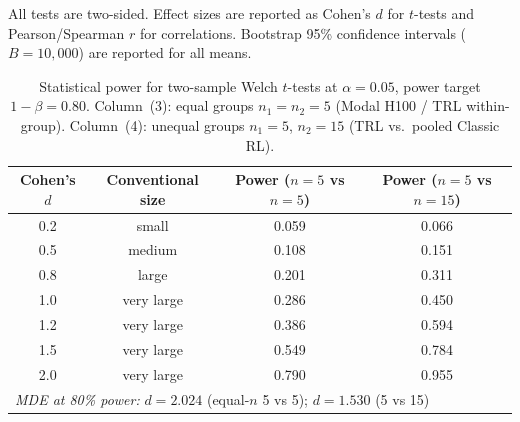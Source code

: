 \documentclass{article}  \usepackage[preprint,nonatbib]{neurips_2026} \usepackage[numbers]{natbib}
\begin{document}
All tests are two-sided.  Effect sizes are reported as Cohen's $d$ for
$t$-tests and Pearson/Spearman $r$ for correlations.  Bootstrap 95\%
confidence intervals ($B = 10{,}000$) are reported for all means.

\begin{table}[!ht]
\centering
\caption{Statistical power for two-sample Welch $t$-tests at $\alpha = 0.05$,
         power target $1{-}\beta = 0.80$.
         Column~(3): equal groups $n_1 = n_2 = 5$ (Modal H100 / TRL within-group).
         Column~(4): unequal groups $n_1 = 5$, $n_2 = 15$ (TRL vs.\ pooled Classic RL).}
\label{tab:power-analysis}
\small
\begin{tabular}{@{}cccc@{}}
\toprule
Cohen's $d$ & Conventional size & Power ($n{=}5$ vs $n{=}5$) & Power ($n{=}5$ vs $n{=}15$) \\
\midrule
        0.2 & small & 0.059 & 0.066 \\
        0.5 & medium & 0.108 & 0.151 \\
        0.8 & large & 0.201 & 0.311 \\
        1.0 & very large & 0.286 & 0.450 \\
        1.2 & very large & 0.386 & 0.594 \\
        1.5 & very large & 0.549 & 0.784 \\
        2.0 & very large & 0.790 & 0.955 \\
\midrule
\multicolumn{4}{l}{\textit{MDE at 80\% power:} $d = 2.024$ (equal-$n$ 5 vs 5);\; $d = 1.530$ (5 vs 15)} \\
\bottomrule
\end{tabular}
\end{table}
\end{document}
